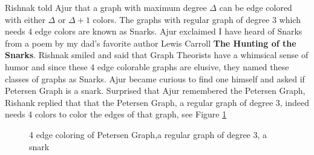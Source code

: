 Rishnak told Ajur that a graph with maximum degree $\Delta$ can be edge colored with either $\Delta$ or $\Delta+1$ colors. The graphs with regular
graph of degree 3 which needs 4 edge colors are known as Snarks. Ajur exclaimed I have heard of Snarks from a poem by my dad's favorite author Lewis Carroll
\textbf{The Hunting of the Snarks}. Rishnak smiled and said that Graph Theorists have a whimsical sense of humor and since these 4 edge colorable graphs are elusive, they named these classes of graphs as Snarks.
Ajur became curious to find one himself and asked if Petersen Graph is a snark. Surprised that Ajur remembered the Petersen Graph, Rishank replied that that the Petersen Graph, a regular graph of degree 3, indeed needs 4 colors to color the edges of that graph, see Figure \ref{10g7}
\begin{figure}
\begin{center}
\caption{ 4 edge coloring of Petersen Graph,a regular graph of degree 3, a snark }\label{10g7}
\end{center}
\end{figure}

